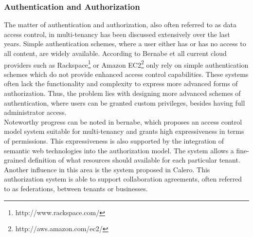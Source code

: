 \subsubsection{Authentication and Authorization}
The matter of authentication and authorization, also often referred to as data access control, in multi-tenancy has been discussed extensively over the last years. Simple authentication schemes, where a user either has or has no access to all content, are widely available. According to Bernabe et all \cite{Bernabe2012Auth} current cloud providers such as Rackspace\footnote{http://www.rackspace.com/} or Amazon EC2\footnote{http://aws.amazon.com/ec2/} only rely on simple authentication schemes which do not provide enhanced access control capabilities. These systems often lack the functionality and complexity to express more advanced forms of authorization. Thus, the problem lies with designing more advanced schemes of authentication, where users can be granted custom privileges, besides having full administrator access.\\
Noteworthy progress can be noted in bernabe\cite{Bernabe2012Auth}, which proposes an access control model system suitable for multi-tenancy and grants high expressiveness in terms of permissions. This expressiveness is also supported by the integration of semantic web technologies into the authorization model. The system allows a fine-grained definition of what resources should available for each particular tenant. Another influence in this area is the system proposed in Calero\cite{Calero2010Auth}. This authorization system is able to support collaboration agreements, often referred to as federations, between tenants or businesses.


